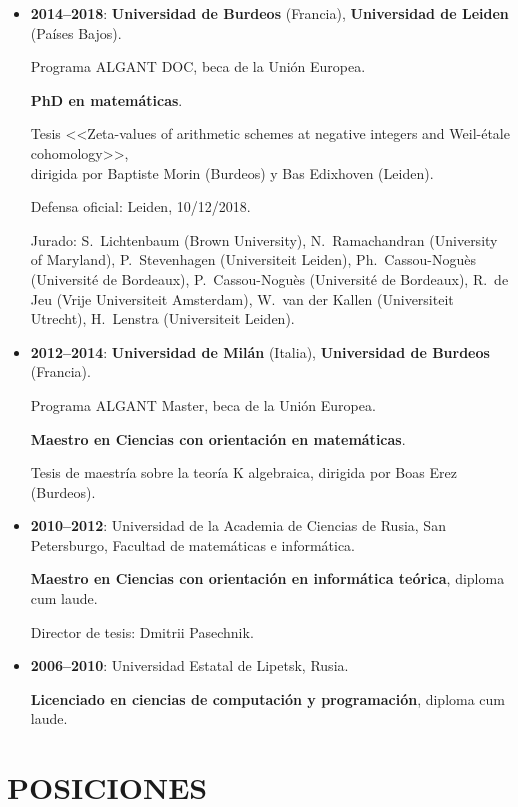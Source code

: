 \documentclass{article}
\begin{document}
\begin{itemize}
\item \textbf{2014--2018}: \textbf{Universidad de Burdeos} (Francia),
  \textbf{Universidad de Leiden} (Países Bajos).

  Programa ALGANT DOC, beca de la Unión Europea.

  \textbf{PhD en matemáticas}.

  Tesis <<Zeta-values of arithmetic schemes at negative integers and Weil-étale cohomology>>,\\
  dirigida por Baptiste Morin (Burdeos) y Bas Edixhoven (Leiden).

  Defensa oficial: Leiden, 10/12/2018.

  Jurado:
  S.~Lichtenbaum (Brown University),
  N.~Ramachandran (University of Maryland),
  P.~Stevenhagen (Universiteit Leiden),
  Ph.~Cassou-Noguès (Université de Bordeaux),
  P.~Cassou-Noguès (Université de Bordeaux),
  R.~de Jeu (Vrije Universiteit Amsterdam),
  W.~van der Kallen (Universiteit Utrecht),
  H.~Lenstra (Universiteit Leiden).

\item \textbf{2012--2014}: \textbf{Universidad de Milán} (Italia),
  \textbf{Universidad de Burdeos} (Francia).

  Programa ALGANT Master, beca de la Unión Europea.

  \textbf{Maestro en Ciencias con orientación en matemáticas}.

  Tesis de maestría sobre la teoría K algebraica,
  dirigida por Boas Erez (Burdeos).

\item \textbf{2010--2012}: Universidad de la Academia de Ciencias de Rusia,
  San Petersburgo, Facultad de matemáticas e informática.

  \textbf{Maestro en Ciencias con orientación en informática teórica},
  diploma cum laude.

  Director de tesis: Dmitrii Pasechnik.

\item \textbf{2006--2010}: Universidad Estatal de Lipetsk, Rusia.

  \textbf{Licenciado en ciencias de computación y programación},
  diploma cum laude.
\end{itemize}

\pagebreak

{\color{RoyalBlue}\section*{POSICIONES}}
\end{document}
